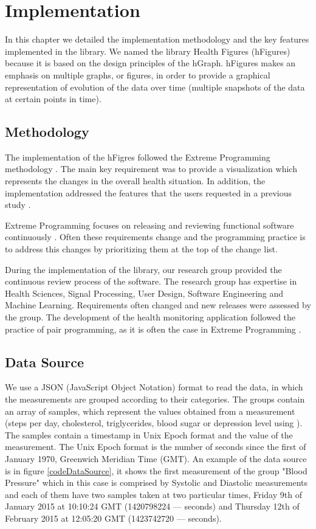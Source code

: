 \documentclass[twocolumn]{bmcart}%
\begin{document}
\section*{Implementation} 

In this chapter we detailed the implementation methodology and the key features implemented in the library. We named the library Health Figures (hFigures) because it is based on the design principles of the hGraph. hFigures makes an emphasis on multiple graphs, or figures, in order to provide a graphical representation of evolution of the data over time (multiple snapshots of the data at certain points in time).

\subsection*{Methodology}

The implementation of the hFigres followed the Extreme Programming methodology \cite{roebuck2012agile, beck2000extreme}. The main key requirement was to provide a visualization which represents the changes in the overall health situation. In addition, the implementation addressed the features that the users requested in a previous study \citep{EMBCLedNiem}.

Extreme Programming focuses on releasing and reviewing functional software continuously \cite{beck2000extreme}. Often these requirements change and the programming practice is to address this changes by prioritizing them at the top of the change list.

During the implementation of the library, our research group provided the continuous review process of the software. The research group has expertise in Health Sciences, Signal Processing, User Design, Software Engineering and Machine Learning. Requirements often changed and new releases were assessed by the group. The development of the health monitoring application followed the practice of pair programming, as it is often the case in Extreme Programming \cite{roebuck2012agile}.

\subsection*{Data Source}

We use a JSON (JavaScript Object Notation) format to read the data, in which the measurements are grouped according to their categories. The groups contain an array of samples, which represent the values obtained from a measurement (steps per day, cholesterol, triglycerides, blood sugar or depression level using \cite{poutanen2010validity}). The samples contain a timestamp in Unix Epoch format and the value of the measurement. The Unix Epoch format is the number of seconds since the first of January 1970, Greenwich Meridian Time (GMT). An example of the data source is in figure \ref{codeDataSource}, it shows the first measurement of the group "Blood Pressure" which in this case is comprised by Systolic and Diastolic measurements and each of them have two samples taken at two particular times, Friday 9th of January 2015 at 10:10:24 GMT (1420798224 --- seconds) and Thursday 12th of February 2015 at 12:05:20 GMT (1423742720 --- seconds).
\end{document}
